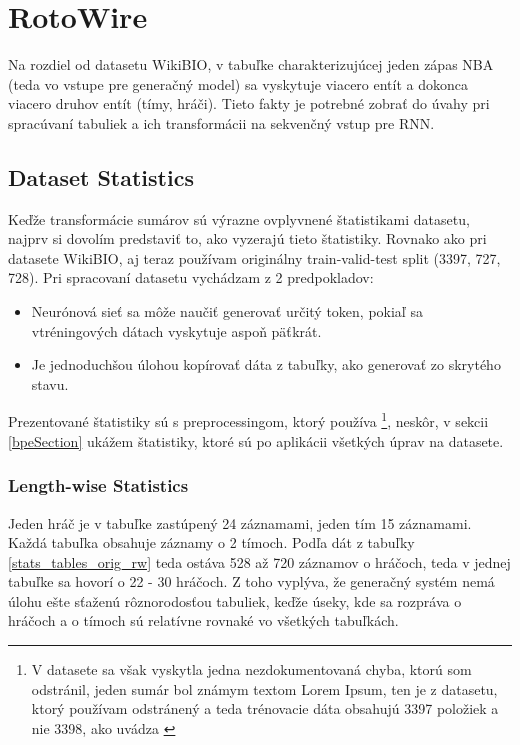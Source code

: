 \section{RotoWire} \label{rotowire_preproc_section}

Na rozdiel od datasetu WikiBIO, v tabuľke charakterizujúcej jeden zápas NBA (teda vo vstupe pre generačný model) sa vyskytuje viacero entít a dokonca viacero druhov entít (tímy, hráči). Tieto fakty je potrebné zobrať do úvahy pri spracúvaní tabuliek a ich transformácii na sekvenčný vstup pre RNN.

\subsection{Dataset Statistics} \label{assumptions_ref}

Keďže transformácie sumárov sú výrazne ovplyvnené štatistikami datasetu, najprv si dovolím predstaviť to, ako vyzerajú tieto štatistiky. Rovnako ako pri datasete WikiBIO, aj teraz používam originálny train-valid-test split (3397, 727, 728). Pri spracovaní datasetu vychádzam z 2 predpokladov:
\begin{itemize}
\item Neurónová sieť sa môže naučiť generovať určitý token, pokiaľ sa v\linebreak[4]tréningových dátach vyskytuje aspoň päťkrát.
\item Je jednoduchšou úlohou kopírovať dáta z tabuľky, ako generovať zo skrytého stavu.
\end{itemize}

Prezentované štatistiky sú s preprocessingom, ktorý používa \citep{wiseman2017} \footnote{V datasete sa však vyskytla jedna nezdokumentovaná chyba, ktorú som odstránil, jeden sumár bol známym textom Lorem Ipsum, ten je z datasetu, ktorý používam odstránený a teda trénovacie dáta obsahujú 3397 položiek a nie 3398, ako uvádza \citep{wiseman2017} \label{footnote_wis_fault_li}}, neskôr, v sekcii \ref{bpeSection} ukážem štatistiky, ktoré sú po aplikácii všetkých úprav na datasete.

\subsubsection{Length-wise Statistics}

Jeden hráč je v tabuľke zastúpený 24 záznamami, jeden tím 15 záznamami. Každá tabuľka obsahuje záznamy o 2 tímoch. Podľa dát z tabuľky \ref{stats_tables_orig_rw} teda ostáva 528 až 720 záznamov o hráčoch, teda v jednej tabuľke sa hovorí o 22 - 30 hráčoch. Z toho vyplýva, že generačný systém nemá úlohu ešte sťaženú rôznorodosťou tabuliek, keďže úseky, kde sa rozpráva o hráčoch a o tímoch sú relatívne rovnaké vo všetkých tabuľkách.

